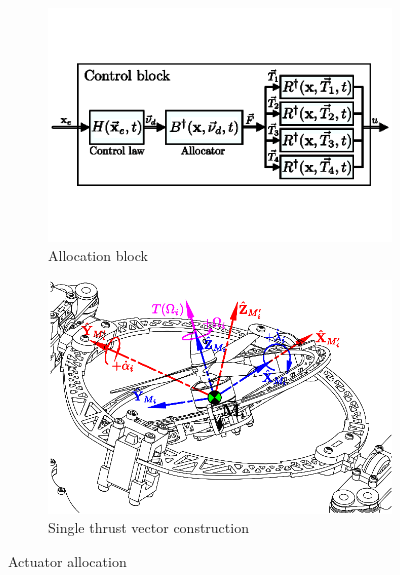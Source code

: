 \begin{figure}[htbp]
\vspace{-6pt}
\centering
\begin{subfigure}{0.48\textwidth}
\centering
\includegraphics[width=\textwidth]{figs/allocator-block}
\vspace{-8pt}
\caption{Allocation block}
\label{fig:allocation-block}
\end{subfigure}
\begin{subfigure}{0.48\textwidth}
\centering
\includegraphics[width=\textwidth]{figs/force-redirect}
\vspace{-8pt}
\caption{Single thrust vector construction}
\label{fig:allocation-redirect}
\end{subfigure}
\vspace{-8pt}
\caption{Actuator allocation}
\vspace{-16pt}
\end{figure}
